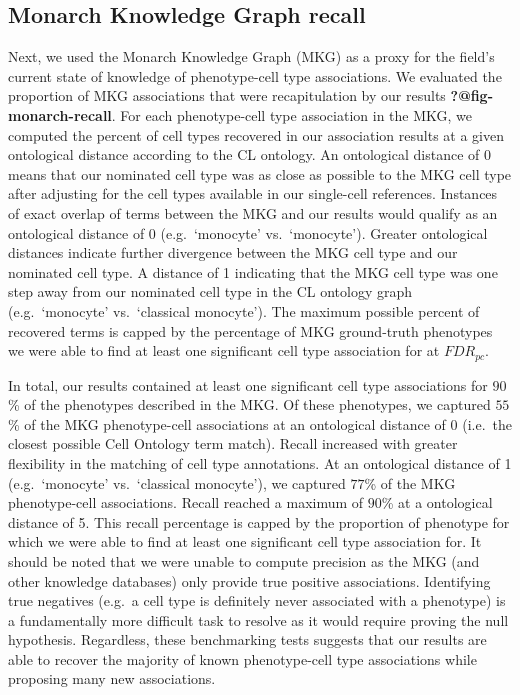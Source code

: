 \documentclass[
]{report}
\begin{document}
\subsection{Monarch Knowledge Graph
recall}\label{monarch-knowledge-graph-recall}

Next, we used the Monarch Knowledge Graph (MKG) as a proxy for the
field's current state of knowledge of phenotype-cell type associations.
We evaluated the proportion of MKG associations that were recapitulation
by our results \textbf{?@fig-monarch-recall}. For each phenotype-cell
type association in the MKG, we computed the percent of cell types
recovered in our association results at a given ontological distance
according to the CL ontology. An ontological distance of 0 means that
our nominated cell type was as close as possible to the MKG cell type
after adjusting for the cell types available in our single-cell
references. Instances of exact overlap of terms between the MKG and our
results would qualify as an ontological distance of 0 (e.g.~`monocyte'
vs.~`monocyte'). Greater ontological distances indicate further
divergence between the MKG cell type and our nominated cell type. A
distance of 1 indicating that the MKG cell type was one step away from
our nominated cell type in the CL ontology graph (e.g.~`monocyte'
vs.~`classical monocyte'). The maximum possible percent of recovered
terms is capped by the percentage of MKG ground-truth phenotypes we were
able to find at least one significant cell type association for at
\(FDR_{pc}\).

In total, our results contained at least one significant cell type
associations for \(90\)\% of the phenotypes described in the MKG. Of
these phenotypes, we captured \(55\)\% of the MKG phenotype-cell
associations at an ontological distance of 0 (i.e.~the closest possible
Cell Ontology term match). Recall increased with greater flexibility in
the matching of cell type annotations. At an ontological distance of 1
(e.g.~`monocyte' vs.~`classical monocyte'), we captured \(77\)\% of the
MKG phenotype-cell associations. Recall reached a maximum of \(90\)\% at
a ontological distance of 5. This recall percentage is capped by the
proportion of phenotype for which we were able to find at least one
significant cell type association for. It should be noted that we were
unable to compute precision as the MKG (and other knowledge databases)
only provide true positive associations. Identifying true negatives
(e.g.~a cell type is definitely never associated with a phenotype) is a
fundamentally more difficult task to resolve as it would require proving
the null hypothesis. Regardless, these benchmarking tests suggests that
our results are able to recover the majority of known phenotype-cell
type associations while proposing many new associations.
\end{document}
